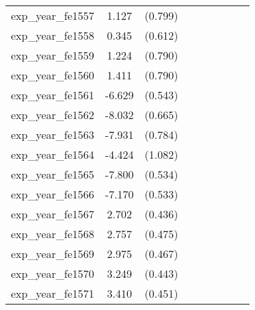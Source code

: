 {\begin{tabular}{l*{4}{cc}}
exp\_year\_fe1557&    1.127         &  (0.799)&                  &         &                  &         &                  &         \\
exp\_year\_fe1558&    0.345         &  (0.612)&                  &         &                  &         &                  &         \\
exp\_year\_fe1559&    1.224         &  (0.790)&                  &         &                  &         &                  &         \\
exp\_year\_fe1560&    1.411         &  (0.790)&                  &         &                  &         &                  &         \\
exp\_year\_fe1561&   -6.629\sym{***}&  (0.543)&                  &         &                  &         &                  &         \\
exp\_year\_fe1562&   -8.032\sym{***}&  (0.665)&                  &         &                  &         &                  &         \\
exp\_year\_fe1563&   -7.931\sym{***}&  (0.784)&                  &         &                  &         &                  &         \\
exp\_year\_fe1564&   -4.424\sym{***}&  (1.082)&                  &         &                  &         &                  &         \\
exp\_year\_fe1565&   -7.800\sym{***}&  (0.534)&                  &         &                  &         &                  &         \\
exp\_year\_fe1566&   -7.170\sym{***}&  (0.533)&                  &         &                  &         &                  &         \\
exp\_year\_fe1567&    2.702\sym{***}&  (0.436)&                  &         &                  &         &                  &         \\
exp\_year\_fe1568&    2.757\sym{***}&  (0.475)&                  &         &                  &         &                  &         \\
exp\_year\_fe1569&    2.975\sym{***}&  (0.467)&                  &         &                  &         &                  &         \\
exp\_year\_fe1570&    3.249\sym{***}&  (0.443)&                  &         &                  &         &                  &         \\
exp\_year\_fe1571&    3.410\sym{***}&  (0.451)&                  &         &                  &         &                  &         \\

\end{tabular}}
